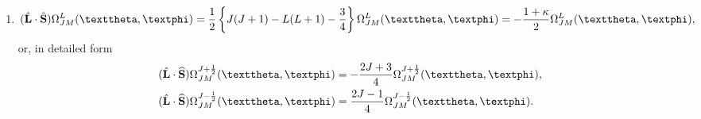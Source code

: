 \begin{enumerate}[label=(\alph*)]
\begin{equation}
\end{equation}
In a more detailed form \eqref{eq:7:2:26} gives
\begin{align}
& r(\widehat{\vect{S}}\cdot \boldsymbol{\nabla}) \Omega_{J M}^{J+\frac{1}{2}}(\vartheta, \varphi)=-\frac{2 J+3}{4} \Omega_{J M}^{J-\frac{1}{2}}(\vartheta, \varphi), \notag\\
& r(\widehat{\vect{S}}\cdot \boldsymbol{\nabla}) \Omega_{J M}^{J-\frac{1}{2}}(\vartheta, \varphi)=\frac{2 J-1}{4} \Omega_{J M}^{J+\frac{1}{2}}(\vartheta, \varphi) . \label{eq:7:2:28}
\end{align}
\item
\begin{equation}
(\hat{\vect{L}} \cdot \hat{\vect{S}}) \Omega_{J M}^{L}(\vartheta, \varphi)=\frac{1}{2}\left\{J(J+1)-L(L+1)-\frac{3}{4}\right\} \Omega_{J M}^{L}(\vartheta, \varphi)=-\frac{1+\kappa}{2} \Omega_{J M}^{L}(\vartheta, \varphi), \label{eq:7:2:29}
\end{equation}
or, in detailed form
\begin{align}
& (\hat{\vect{L}} \cdot \widehat{\vect{S}}) \Omega_{J M}^{J+\frac{1}{2}}(\vartheta, \varphi)=-\frac{2 J+3}{4} \Omega_{J M}^{J+\frac{1}{2}}(\vartheta, \varphi), \label{eq:7:2:30}\\
& (\hat{\vect{L}} \cdot \widehat{\vect{S}}) \Omega_{J M}^{J-\frac{1}{2}}(\vartheta, \varphi)=\frac{2 J-1}{4} \Omega_{J M}^{J-\frac{1}{2}}(\vartheta, \varphi). \notag
\end{align}
\end{enumerate}

